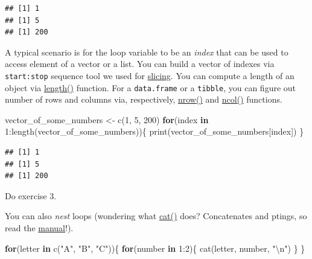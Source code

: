 \documentclass[
]{book}
\newenvironment{Shaded}{\begin{snugshade}}{\end{snugshade}}
\newcommand{\ControlFlowTok}[1]{\textcolor[rgb]{0.13,0.29,0.53}{\textbf{#1}}}
\newcommand{\DecValTok}[1]{\textcolor[rgb]{0.00,0.00,0.81}{#1}}
\newcommand{\FunctionTok}[1]{\textcolor[rgb]{0.00,0.00,0.00}{#1}}
\newcommand{\NormalTok}[1]{#1}
\newcommand{\OtherTok}[1]{\textcolor[rgb]{0.56,0.35,0.01}{#1}}
\newcommand{\SpecialCharTok}[1]{\textcolor[rgb]{0.00,0.00,0.00}{#1}}
\newcommand{\StringTok}[1]{\textcolor[rgb]{0.31,0.60,0.02}{#1}}
\begin{document}
\begin{verbatim}
## [1] 1
## [1] 5
## [1] 200
\end{verbatim}

A typical scenario is for the loop variable to be an \emph{index} that can be used to access element of a vector or a list. You can build a vector of indexes via \texttt{start:stop} sequence tool we used for \protect\hyperlink{vector-index-slicing}{slicing}. You can compute a length of an object via \href{https://stat.ethz.ch/R-manual/R-devel/library/base/html/length.html}{length()} function. For a \texttt{data.frame} or a \texttt{tibble}, you can figure out number of rows and columns via, respectively, \href{https://stat.ethz.ch/R-manual/R-devel/library/base/html/nrow.html}{nrow()} and \href{https://stat.ethz.ch/R-manual/R-devel/library/base/html/nrow.html}{ncol()} functions.

\begin{Shaded}
\begin{Highlighting}[]
\NormalTok{vector\_of\_some\_numbers }\OtherTok{\textless{}{-}} \FunctionTok{c}\NormalTok{(}\DecValTok{1}\NormalTok{, }\DecValTok{5}\NormalTok{, }\DecValTok{200}\NormalTok{)}
\ControlFlowTok{for}\NormalTok{(index }\ControlFlowTok{in} \DecValTok{1}\SpecialCharTok{:}\FunctionTok{length}\NormalTok{(vector\_of\_some\_numbers))\{}
  \FunctionTok{print}\NormalTok{(vector\_of\_some\_numbers[index])}
\NormalTok{\}}
\end{Highlighting}
\end{Shaded}

\begin{verbatim}
## [1] 1
## [1] 5
## [1] 200
\end{verbatim}

Do exercise 3.

You can also \emph{nest} loops (wondering what \href{https://stat.ethz.ch/R-manual/R-devel/library/base/html/cat.html}{cat()} does? Concatenates and ptings, so read the \href{https://stat.ethz.ch/R-manual/R-devel/library/base/html/cat.html}{manual}!).

\begin{Shaded}
\begin{Highlighting}[]
\ControlFlowTok{for}\NormalTok{(letter }\ControlFlowTok{in} \FunctionTok{c}\NormalTok{(}\StringTok{"A"}\NormalTok{, }\StringTok{"B"}\NormalTok{, }\StringTok{"C"}\NormalTok{))\{}
  \ControlFlowTok{for}\NormalTok{(number }\ControlFlowTok{in} \DecValTok{1}\SpecialCharTok{:}\DecValTok{2}\NormalTok{)\{}
    \FunctionTok{cat}\NormalTok{(letter, number, }\StringTok{"}\SpecialCharTok{\textbackslash{}n}\StringTok{"}\NormalTok{)}
\NormalTok{  \}}
\NormalTok{\}}
\end{Highlighting}
\end{Shaded}
\end{document}
